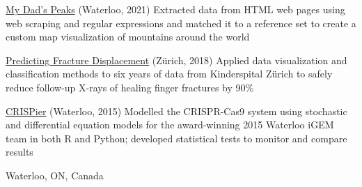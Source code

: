 \documentclass[a4paper,11pt]{article}
\newenvironment{compactDesc}
{ \begin{description}
		\setlength{\itemsep}{2pt}
		\setlength{\parskip}{2pt}
		\setlength{\parsep}{1pt}     }
	{ \end{description}                  }
\begin{document}
\vspace{0.1cm}
 \hrulefill
\vspace{-0.1cm}

\begin{compactDesc}
	\item[\href{https://medium.com/@cdsalahub/mapping-my-dads-peaks-b36b756443f2}{My Dad's Peaks}] (Waterloo, 2021) {\footnotesize Extracted data from HTML web pages using web scraping and regular expressions and matched it to a reference set to create a custom map visualization of mountains around the world}
	\item[\href{https://www.zora.uzh.ch/id/eprint/161560/1/Nonarticular_Base_and_Shaft_Fractures_of.98596.pdf}{Predicting Fracture Displacement}] (Z\"urich, 2018) {\footnotesize Applied data visualization and classification methods to six years of data from Kinderspital Z\"urich to safely reduce follow-up X-rays of healing finger fractures by 90\%}
	\item[\href{http://2015.igem.org/Team:Waterloo}{CRISPier}] (Waterloo, 2015) {\footnotesize Modelled the CRISPR-Cas9 system using stochastic and differential equation models for the award-winning 2015 Waterloo iGEM team in both R and Python; developed statistical tests to monitor and compare results}
\end{compactDesc}

\vspace{0.2cm}
 \hrulefill
\vspace{0.2cm}

 \hfill Waterloo, ON, Canada
\vspace{0.1cm}
	
\end{document}
